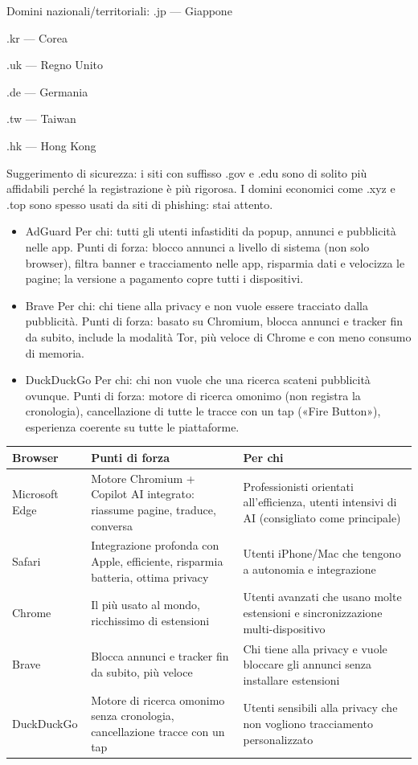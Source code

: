 Domini nazionali/territoriali: .jp — Giappone

.kr — Corea

.uk — Regno Unito

.de — Germania

.tw — Taiwan

.hk — Hong Kong

Suggerimento di sicurezza: i siti con suffisso .gov e .edu sono di solito più affidabili perché la registrazione è più rigorosa. I domini economici come .xyz e .top sono spesso usati da siti di phishing: stai attento.


\begin{itemize}
  \item AdGuard Per chi: tutti gli utenti infastiditi da popup, annunci e pubblicità nelle app. Punti di forza: blocco annunci a livello di sistema (non solo browser), filtra banner e tracciamento nelle app, risparmia dati e velocizza le pagine; la versione a pagamento copre tutti i dispositivi.
\end{itemize}


\begin{itemize}
  \item Brave Per chi: chi tiene alla privacy e non vuole essere tracciato dalla pubblicità. Punti di forza: basato su Chromium, blocca annunci e tracker fin da subito, include la modalità Tor, più veloce di Chrome e con meno consumo di memoria.
  \item DuckDuckGo Per chi: chi non vuole che una ricerca scateni pubblicità ovunque. Punti di forza: motore di ricerca omonimo (non registra la cronologia), cancellazione di tutte le tracce con un tap («Fire Button»), esperienza coerente su tutte le piattaforme.
\end{itemize}


\begin{center}
\begin{tabularx}{\linewidth}{|X|X|X|}
\hline
\textbf{Browser} & \textbf{Punti di forza} & \textbf{Per chi} \tabularnewline
\hline
Microsoft Edge & Motore Chromium + Copilot AI integrato: riassume pagine, traduce, conversa & Professionisti orientati all'efficienza, utenti intensivi di AI (consigliato come principale) \tabularnewline
Safari & Integrazione profonda con Apple, efficiente, risparmia batteria, ottima privacy & Utenti iPhone/Mac che tengono a autonomia e integrazione \tabularnewline
Chrome & Il più usato al mondo, ricchissimo di estensioni & Utenti avanzati che usano molte estensioni e sincronizzazione multi-dispositivo \tabularnewline
Brave & Blocca annunci e tracker fin da subito, più veloce & Chi tiene alla privacy e vuole bloccare gli annunci senza installare estensioni \tabularnewline
DuckDuckGo & Motore di ricerca omonimo senza cronologia, cancellazione tracce con un tap & Utenti sensibili alla privacy che non vogliono tracciamento personalizzato \tabularnewline
\hline
\end{tabularx}
\end{center}

